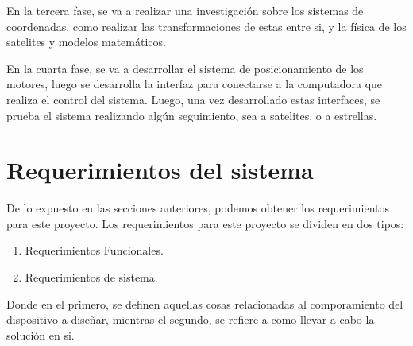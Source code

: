 En la tercera fase, se va a realizar una investigación sobre los sistemas de coordenadas, como realizar las transformaciones de estas entre si, y la física de los satelites y modelos matemáticos.

En la cuarta fase, se va a desarrollar el sistema de posicionamiento de los motores, luego se desarrolla la interfaz para conectarse a la computadora que realiza el control del sistema. Luego, una vez desarrollado estas interfaces, se prueba el sistema realizando algún seguimiento, sea a satelites, o a estrellas.  



















\section{ Requerimientos del sistema} \label{req_sist}

De lo expuesto en las secciones anteriores, podemos obtener los requerimientos para este proyecto. Los requerimientos para este proyecto se dividen en dos tipos:  
\begin{enumerate}
	\item Requerimientos Funcionales.  
	\item Requerimientos de sistema. 
\end{enumerate} 
Donde en el primero, se definen aquellas cosas relacionadas al comporamiento del dispositivo a diseñar, mientras el segundo, se refiere a como llevar a cabo la solución en si. 


\renewcommand{\arraystretch}{1.5}


